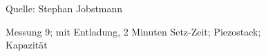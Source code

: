 \documentclass[12pt]{scrreprt} %
\begin{document}
\begin {figure}[htbp]
\caption[Messung 9; 2 Minuten Setz-Zeit; Piezostack; Kapazität]{Messung 9; mit Entladung, 2 Minuten Setz-Zeit; Piezostack; Kapazität}
      \begin{center}
      \end{center}
Quelle: Stephan Jobstmann
\label{fig:2.9}
\end{figure}
\setlongtables
\end{document}
